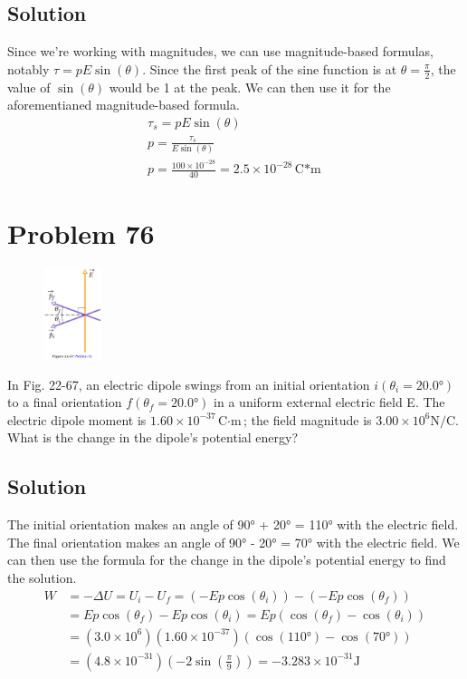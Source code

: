 \documentclass[12pt]{article}
\begin{document}
\subsection*{Solution}
Since we're working with magnitudes, we can use magnitude-based formulas, notably \(\tau = pE\sin(\theta)\). 
Since the first peak of the sine function is at $\theta = \frac{\pi}{2}$, the value of $\sin(\theta)$ would be 1 at the peak. 
We can then use it for the aforementianed magnitude-based formula.
\begin{gather*}
    \tau_s  =   pE\sin(\theta)\\
    p   =   \frac{\tau_s}{E\sin(\theta)}\\
    p   =   \frac{100 \times 10^{-28}}{40}
        =   \boxed{2.5 \times 10^{-28} \unit{\coulomb*\meter}}
\end{gather*}

\pagebreak
\section{Problem 76}
\begin{figure}
    \vspace{-30pt}
    \includegraphics[width=0.15\textwidth]{picture_6.png} 
\end{figure}
In Fig. 22-67, an electric dipole swings from an initial orientation $i (\theta_i = 20.0\unit{\degree})$ to a final orientation $f (\theta_f= 20.0\unit{\degree})$ in a uniform external electric field E. The electric dipole moment is $1.60 \times 10^{-37} \unit{\coulomb\cdot\meter}$; the field magnitude is $3.00 \times 10^6 \unit{\newton/\coulomb}$. What is the change in the dipole's potential energy?

\subsection*{Solution}
The initial orientation makes an angle of 90\unit{\degree} + 20\unit{\degree} = 110\unit{\degree} with the electric field.
The final orientation makes an angle of 90\unit{\degree} - 20\unit{\degree} = 70\unit{\degree} with the electric field.
We can then use the formula for the change in the dipole's potential energy to find the solution.
\begin{align*}
    W   &=  -\Delta U
        =   U_i - U_f
        =   (-Ep\cos(\theta_i)) - (-Ep\cos(\theta_f))\\
        &=  Ep\cos(\theta_f) - Ep\cos(\theta_i)
        =   Ep(\cos(\theta_f) - \cos(\theta_i))\\
        &=  (3.0 \times 10^6)(1.60 \times 10^{-37})(\cos(110\unit{\degree}) - \cos(70\unit{\degree}))\\
        &=  \left(4.8 \times 10^{-31}\right)\left(-2\sin\left(\frac{\pi}{9}\right)\right)
        =   \boxed{-3.283 \times 10^{-31} \unit{\joule}}
\end{align*}
\end{document}
